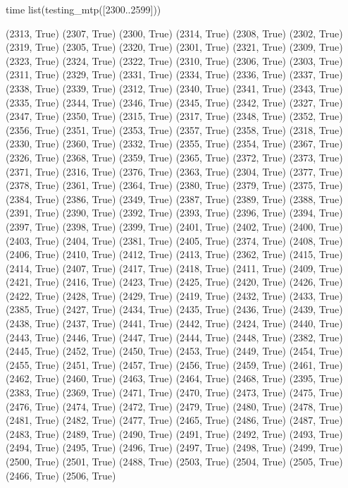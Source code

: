  
  time list(testing_mtp([2300..2599]))

(2313, True)
(2307, True)
(2300, True)
(2314, True)
(2308, True)
(2302, True)
(2319, True)
(2305, True)
(2320, True)
(2301, True)
(2321, True)
(2309, True)
(2323, True)
(2324, True)
(2322, True)
(2310, True)
(2306, True)
(2303, True)
(2311, True)
(2329, True)
(2331, True)
(2334, True)
(2336, True)
(2337, True)
(2338, True)
(2339, True)
(2312, True)
(2340, True)
(2341, True)
(2343, True)
(2335, True)
(2344, True)
(2346, True)
(2345, True)
(2342, True)
(2327, True)
(2347, True)
(2350, True)
(2315, True)
(2317, True)
(2348, True)
(2352, True)
(2356, True)
(2351, True)
(2353, True)
(2357, True)
(2358, True)
(2318, True)
(2330, True)
(2360, True)
(2332, True)
(2355, True)
(2354, True)
(2367, True)
(2326, True)
(2368, True)
(2359, True)
(2365, True)
(2372, True)
(2373, True)
(2371, True)
(2316, True)
(2376, True)
(2363, True)
(2304, True)
(2377, True)
(2378, True)
(2361, True)
(2364, True)
(2380, True)
(2379, True)
(2375, True)
(2384, True)
(2386, True)
(2349, True)
(2387, True)
(2389, True)
(2388, True)
(2391, True)
(2390, True)
(2392, True)
(2393, True)
(2396, True)
(2394, True)
(2397, True)
(2398, True)
(2399, True)
(2401, True)
(2402, True)
(2400, True)
(2403, True)
(2404, True)
(2381, True)
(2405, True)
(2374, True)
(2408, True)
(2406, True)
(2410, True)
(2412, True)
(2413, True)
(2362, True)
(2415, True)
(2414, True)
(2407, True)
(2417, True)
(2418, True)
(2411, True)
(2409, True)
(2421, True)
(2416, True)
(2423, True)
(2425, True)
(2420, True)
(2426, True)
(2422, True)
(2428, True)
(2429, True)
(2419, True)
(2432, True)
(2433, True)
(2385, True)
(2427, True)
(2434, True)
(2435, True)
(2436, True)
(2439, True)
(2438, True)
(2437, True)
(2441, True)
(2442, True)
(2424, True)
(2440, True)
(2443, True)
(2446, True)
(2447, True)
(2444, True)
(2448, True)
(2382, True)
(2445, True)
(2452, True)
(2450, True)
(2453, True)
(2449, True)
(2454, True)
(2455, True)
(2451, True)
(2457, True)
(2456, True)
(2459, True)
(2461, True)
(2462, True)
(2460, True)
(2463, True)
(2464, True)
(2468, True)
(2395, True)
(2383, True)
(2369, True)
(2471, True)
(2470, True)
(2473, True)
(2475, True)
(2476, True)
(2474, True)
(2472, True)
(2479, True)
(2480, True)
(2478, True)
(2481, True)
(2482, True)
(2477, True)
(2465, True)
(2486, True)
(2487, True)
(2483, True)
(2489, True)
(2490, True)
(2491, True)
(2492, True)
(2493, True)
(2494, True)
(2495, True)
(2496, True)
(2497, True)
(2498, True)
(2499, True)
(2500, True)
(2501, True)
(2488, True)
(2503, True)
(2504, True)
(2505, True)
(2466, True)
(2506, True)
